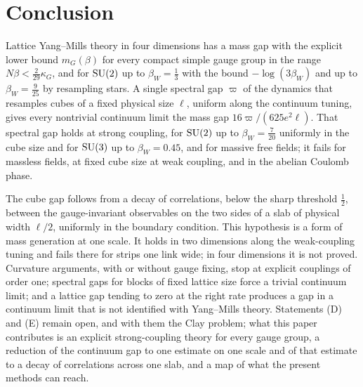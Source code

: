\section{Conclusion}\label{sec:conclusion}

Lattice Yang--Mills theory in four dimensions has a mass gap with the explicit
lower bound $m_G(\beta)$ for every compact simple gauge group in the range
$N\beta<\frac2{29}\kappa_G$, and for $\mathrm{SU}(2)$ up to $\beta_W=\frac13$ with
the bound $-\log(3\beta_W)$ and up to $\beta_W=\frac9{25}$ by resampling stars. A
single
spectral gap $\varpi$ of the dynamics that resamples cubes of a fixed physical
size $\ell$, uniform along the continuum tuning, gives every nontrivial
continuum limit the mass gap $16\varpi/(625e^2\ell)$. That spectral gap holds
at strong coupling, for $\mathrm{SU}(2)$ up to $\beta_W=\frac7{20}$ uniformly in the
cube size and for $\mathrm{SU}(3)$ up to $\beta_W=0.45$, and for massive free fields;
it fails for massless fields, at fixed cube size at weak coupling, and in the
abelian Coulomb phase.

The cube gap follows from a decay of correlations, below the sharp threshold
$\frac12$, between the gauge-invariant observables on the two sides of a slab
of physical width $\ell/2$, uniformly in the boundary condition. This
hypothesis is a form of mass generation at one scale. It holds in two
dimensions along the weak-coupling tuning and fails there for strips one link
wide; in four dimensions it is not proved. Curvature arguments, with or
without gauge fixing, stop at explicit couplings of order one; spectral gaps
for blocks of fixed lattice size force a trivial continuum limit; and a
lattice gap tending to zero at the right rate produces a gap in a continuum
limit that is not identified with Yang--Mills theory. Statements (D) and (E)
remain open, and with them the Clay problem; what this paper contributes is an
explicit strong-coupling theory for every gauge group, a reduction of the
continuum gap to one estimate on one scale and of that estimate to a decay of
correlations across one slab, and a map of what the present methods can reach.
